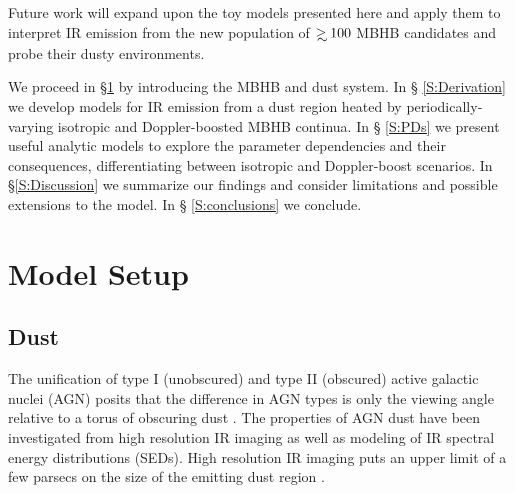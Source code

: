 Future work will expand upon the toy models presented here and apply them to
interpret IR emission from the new population of $\gsim100$ MBHB
candidates \citep{Graham+2015b, Charisi+2016} and probe their dusty
environments.





We proceed in \S \ref{S:Model} by introducing the MBHB and dust system. In \S
\ref{S:Derivation} we develop models for IR emission from a dust region heated
by periodically-varying isotropic and Doppler-boosted MBHB continua. In \S
\ref{S:PDs} we present useful analytic models to explore the parameter
dependencies and their consequences, differentiating between
isotropic and Doppler-boost scenarios. In \S \ref{S:Discussion} we summarize our
findings and consider limitations and possible extensions to the model. In \S
\ref{S:conclusions} we conclude.




\section{Model Setup}
 \label{S:Model}
 \subsection{Dust}

The unification of type I (unobscured) and type II (obscured) active galactic
nuclei (AGN) posits that the difference in AGN types is only the viewing angle
relative to a torus of obscuring dust \citep{Antonucci:1993,
KrolikBegelman:1988}. The properties of AGN dust have been investigated from
high resolution IR imaging as well as modeling of IR spectral energy
distributions (SEDs). High resolution IR imaging puts an upper limit of a few
parsecs on the size of the emitting dust region \citep[see][and references within]{Elitzur:2006}.

